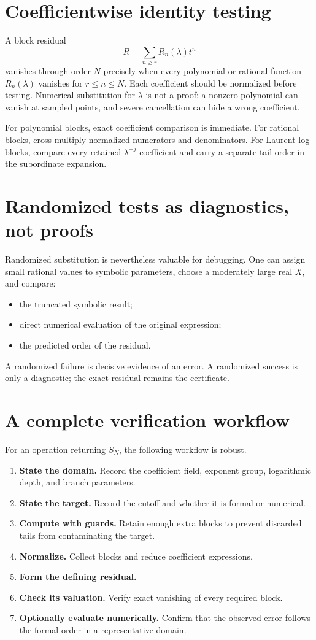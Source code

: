 \documentclass[11pt,openany]{book}
\theoremstyle{definition}
\theoremstyle{plain}
\theoremstyle{remark}
\begin{document}
\section{Coefficientwise identity testing}
A block residual
\[
 R=\sum_{n\ge r}R_n(\lambda)t^n
\]
vanishes through order \(N\) precisely when every polynomial or rational function \(R_n(\lambda)\) vanishes for \(r\le n\le N\). Each coefficient should be normalized before testing. Numerical substitution for \(\lambda\) is not a proof: a nonzero polynomial can vanish at sampled points, and severe cancellation can hide a wrong coefficient.

For polynomial blocks, exact coefficient comparison is immediate. For rational blocks, cross-multiply normalized numerators and denominators. For Laurent-log blocks, compare every retained \(\lambda^{-j}\) coefficient and carry a separate tail order in the subordinate expansion.

\section{Randomized tests as diagnostics, not proofs}
Randomized substitution is nevertheless valuable for debugging. One can assign small rational values to symbolic parameters, choose a moderately large real \(X\), and compare:
\begin{itemize}
\item the truncated symbolic result;
\item direct numerical evaluation of the original expression;
\item the predicted order of the residual.
\end{itemize}
A randomized failure is decisive evidence of an error. A randomized success is only a diagnostic; the exact residual remains the certificate.

\section{A complete verification workflow}
For an operation returning \(S_N\), the following workflow is robust.
\begin{enumerate}
\item \textbf{State the domain.} Record the coefficient field, exponent group, logarithmic depth, and branch parameters.
\item \textbf{State the target.} Record the cutoff and whether it is formal or numerical.
\item \textbf{Compute with guards.} Retain enough extra blocks to prevent discarded tails from contaminating the target.
\item \textbf{Normalize.} Collect blocks and reduce coefficient expressions.
\item \textbf{Form the defining residual.}
\item \textbf{Check its valuation.} Verify exact vanishing of every required block.
\item \textbf{Optionally evaluate numerically.} Confirm that the observed error follows the formal order in a representative domain.
\end{enumerate}
\end{document}
